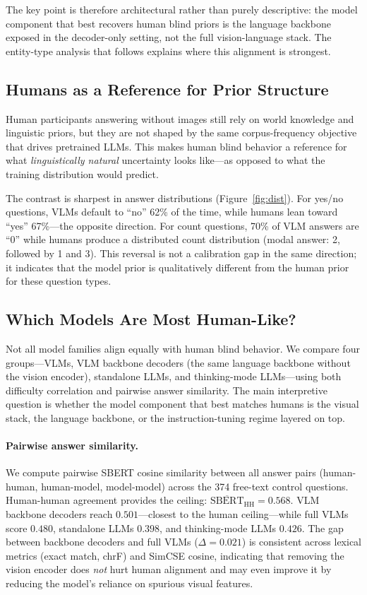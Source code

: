 \documentclass[letterpaper]{article}
\begin{document}
The key point is therefore architectural rather than purely descriptive: the
model component that best recovers human blind priors is the language backbone
exposed in the decoder-only setting, not the full vision-language stack. The
entity-type analysis that follows explains where this alignment is strongest.

\subsection{Humans as a Reference for Prior Structure}
\label{sec:human_ref}

Human participants answering without images still rely on world knowledge and
linguistic priors, but they are not shaped by the same corpus-frequency
objective that drives pretrained LLMs. This makes human blind behavior a
reference for what \emph{linguistically natural} uncertainty looks like---as
opposed to what the training distribution would predict.

The contrast is sharpest in answer distributions (Figure~\ref{fig:dist}).
For yes/no questions, VLMs default to ``no'' 62\% of the time, while humans
lean toward ``yes'' 67\%---the opposite direction. For count questions, 70\%
of VLM answers are ``0'' while humans produce a distributed count distribution
(modal answer: 2, followed by 1 and 3). This reversal is not a calibration gap
in the same direction; it indicates that the model prior is qualitatively
different from the human prior for these question types.

\subsection{Which Models Are Most Human-Like?}
\label{sec:model_similarity}

Not all model families align equally with human blind behavior. We compare four
groups---VLMs, VLM backbone decoders (the same language backbone without the
vision encoder), standalone LLMs, and thinking-mode LLMs---using both
difficulty correlation and pairwise answer similarity. The main interpretive
question is whether the model component that best matches humans is the visual
stack, the language backbone, or the instruction-tuning regime layered on top.

\paragraph{Pairwise answer similarity.}
We compute pairwise SBERT cosine similarity \citep{wang2020minilm} between all
answer pairs (human-human, human-model, model-model) across the 374 free-text
control questions. Human-human agreement provides the ceiling:
$\overline{\text{SBERT}}_{\text{HH}} = 0.568$.
VLM backbone decoders reach $0.501$---closest to the human ceiling---while
full VLMs score $0.480$, standalone LLMs $0.398$, and thinking-mode LLMs $0.426$.
The gap between backbone decoders and full VLMs ($\Delta = 0.021$) is
consistent across lexical metrics (exact match, chrF) and SimCSE cosine,
indicating that removing the vision encoder does \emph{not} hurt
human alignment and may even improve it by reducing the model's reliance on
spurious visual features.
\end{document}

